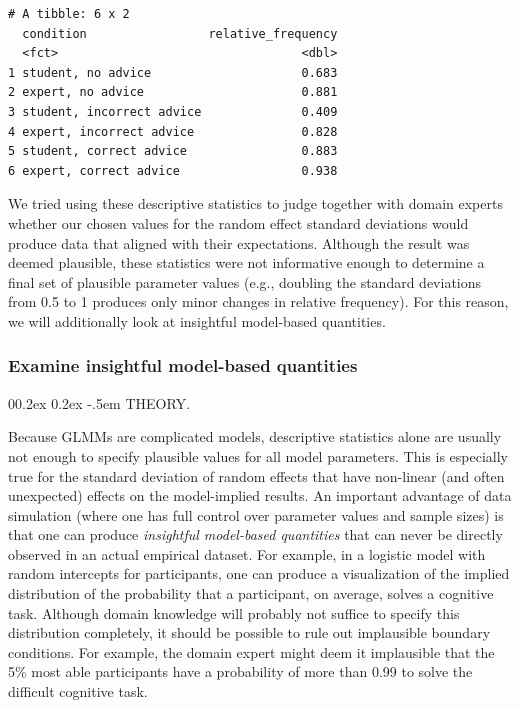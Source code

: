 \documentclass[
  man,
  floatsintext,
  longtable,
  a4paper,
  nolmodern,
  notxfonts,
  notimes,
  colorlinks=true,linkcolor=blue,citecolor=blue,urlcolor=blue]{apa7}
\makeatletter
\renewcommand{\paragraph}{\@startsection{paragraph}{4}{\parindent}%
	{0\baselineskip \@plus 0.2ex \@minus 0.2ex}%
	{-.5em}%
	{\normalfont\normalsize\bfseries\typesectitle}}
\makeatother
\begin{document}
\begin{verbatim}
# A tibble: 6 x 2
  condition                 relative_frequency
  <fct>                                  <dbl>
1 student, no advice                     0.683
2 expert, no advice                      0.881
3 student, incorrect advice              0.409
4 expert, incorrect advice               0.828
5 student, correct advice                0.883
6 expert, correct advice                 0.938
\end{verbatim}

We tried using these descriptive statistics to judge together with
domain experts whether our chosen values for the random effect standard
deviations would produce data that aligned with their expectations.
Although the result was deemed plausible, these statistics were not
informative enough to determine a final set of plausible parameter
values (e.g., doubling the standard deviations from 0.5 to 1 produces
only minor changes in relative frequency). For this reason, we will
additionally look at insightful model-based quantities.

\subsubsection{Examine insightful model-based
quantities}\label{examine-insightful-model-based-quantities}

\paragraph{THEORY.}\label{theory-4}

Because GLMMs are complicated models, descriptive statistics alone are
usually not enough to specify plausible values for all model parameters.
This is especially true for the standard deviation of random effects
that have non-linear (and often unexpected) effects on the model-implied
results. An important advantage of data simulation (where one has full
control over parameter values and sample sizes) is that one can produce
\emph{insightful model-based quantities} that can never be directly
observed in an actual empirical dataset. For example, in a logistic
model with random intercepts for participants, one can produce a
visualization of the implied distribution of the probability that a
participant, on average, solves a cognitive task. Although domain
knowledge will probably not suffice to specify this distribution
completely, it should be possible to rule out implausible boundary
conditions. For example, the domain expert might deem it implausible
that the 5\% most able participants have a probability of more than 0.99
to solve the difficult cognitive task.
\end{document}
